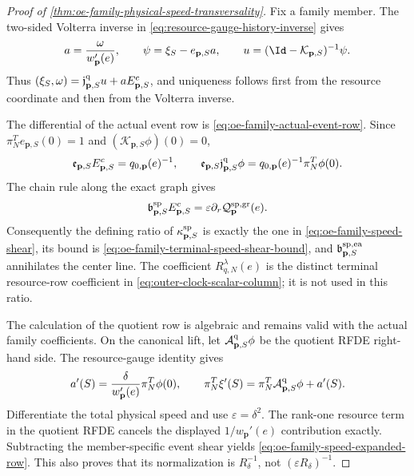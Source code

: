 \begin{proof}[Proof of
\cref{thm:oe-family-physical-speed-transversality}]
Fix a family member.  The two-sided Volterra inverse in
\cref{eq:resource-gauge-history-inverse} gives
\[
 a=\frac{\omega}{w_{\mathbf p}'(e)},\qquad
 \psi=\xi_S-e_{\mathbf p,S}a,\qquad
 u=(\Id-\mathcal K_{\mathbf p,S})^{-1}\psi.
\]
Thus
\((\xi_S,\omega)=\mathfrak j_{\mathbf p,S}^{\rm q}u
+aE_{\mathbf p,S}^c\), and uniqueness follows first from the resource
coordinate and then from the Volterra inverse.

The differential of the actual event row is
\cref{eq:oe-family-actual-event-row}.  Since
\(\pi_N^Te_{\mathbf p,S}(0)=1\) and
\((\mathcal K_{\mathbf p,S}\phi)(0)=0\),
\[
 \mathfrak e_{\mathbf p,S}E_{\mathbf p,S}^c
 =q_{0,\mathbf p}(e)^{-1},\qquad
 \mathfrak e_{\mathbf p,S}
       \mathfrak j_{\mathbf p,S}^{\rm q}\phi
 =q_{0,\mathbf p}(e)^{-1}\pi_N^T\phi(0).
\]
The chain rule along the exact graph gives
\[
 \mathfrak b_{\mathbf p,S}^{\rm sp}E_{\mathbf p,S}^c
 =\varepsilon\partial_r
       \mathcal Q_{\mathbf p}^{\rm sp,gr}(e).
\]
Consequently the defining ratio of
\(\kappa_{\mathbf p,S}^{\rm sp}\) is exactly the one in
\cref{eq:oe-family-speed-shear}, its bound is
\cref{eq:oe-family-terminal-speed-shear-bound}, and
\(\mathfrak b_{\mathbf p,S}^{\rm sp,ea}\) annihilates the center line.
The coefficient \(R_{q,N}^{\lambda}(e)\) is the distinct terminal
resource-row coefficient in \cref{eq:outer-clock-scalar-column}; it is
not used in this ratio.

The calculation of the quotient row is algebraic and remains valid with
the actual family coefficients.  On the canonical lift, let
\(\mathcal A_{\mathbf p,S}^{\rm q}\phi\) be the quotient RFDE
right-hand side.  The resource-gauge identity gives
\[
 a'(S)=\frac{\delta}{w_{\mathbf p}'(e)}\pi_N^T\phi(0),
 \qquad
 \pi_N^T\xi'(S)
 =\pi_N^T\mathcal A_{\mathbf p,S}^{\rm q}\phi+a'(S).
\]
Differentiate the total physical speed and use
\(\varepsilon=\delta^2\).  The rank-one resource term in the quotient
RFDE cancels the displayed \(1/w_{\mathbf p}'(e)\) contribution exactly.
Subtracting the member-specific event shear yields
\cref{eq:oe-family-speed-expanded-row}.  This also proves that its
normalization is \(R_\delta^{-1}\), not
\((\varepsilon R_\delta)^{-1}\).


\end{proof}
